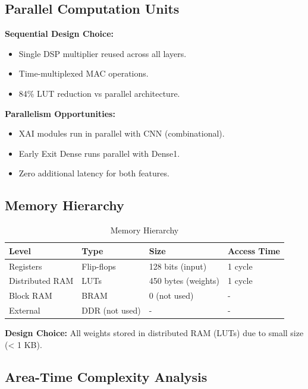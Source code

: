 \documentclass[11pt, a4paper]{article}
\begin{document}
\subsection{Parallel Computation Units}

\textbf{Sequential Design Choice:}
\begin{itemize}
    \item Single DSP multiplier reused across all layers.
    \item Time-multiplexed MAC operations.
    \item 84\% LUT reduction vs parallel architecture.
\end{itemize}

\textbf{Parallelism Opportunities:}
\begin{itemize}
    \item XAI modules run in parallel with CNN (combinational).
    \item Early Exit Dense runs parallel with Dense1.
    \item Zero additional latency for both features.
\end{itemize}

\subsection{Memory Hierarchy}

\begin{table}[H]
\centering
\caption{Memory Hierarchy}
\label{tab:memory}
\begin{tabular}{@{}llll@{}}
\toprule
\textbf{Level} & \textbf{Type} & \textbf{Size} & \textbf{Access Time} \\ \midrule
Registers & Flip-flops & 128 bits (input) & 1 cycle \\
Distributed RAM & LUTs & 450 bytes (weights) & 1 cycle \\
Block RAM & BRAM & 0 (not used) & - \\
External & DDR (not used) & - & - \\ \bottomrule
\end{tabular}
\end{table}

\textbf{Design Choice:} All weights stored in distributed RAM (LUTs) due to small size (< 1 KB).

\subsection{Area-Time Complexity Analysis}
\end{document}

